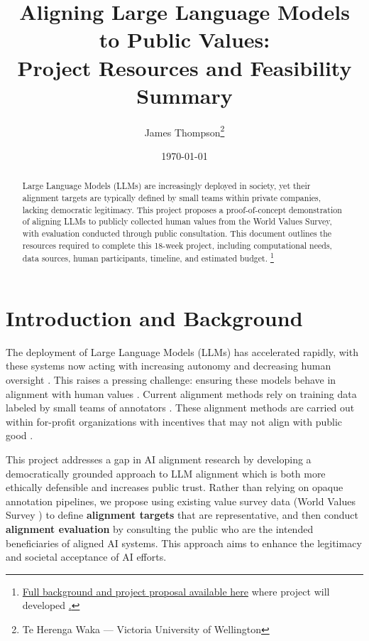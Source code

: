 \documentclass[11pt, a4paper]{article}
\title{Aligning Large Language Models to Public Values:\\Project Resources and Feasibility Summary}
\author{James Thompson\thanks{Te Herenga Waka — Victoria University of Wellington}}
\date{\today}
\newcommand{\term}[1]{\textbf{#1}}
\begin{document}
\maketitle

\begin{abstract}
	Large Language Models (LLMs) are increasingly deployed in society, yet their alignment targets are typically defined by small teams within private companies, lacking democratic legitimacy. This project proposes a proof-of-concept demonstration of aligning LLMs to publicly collected human values from the World Values Survey, with evaluation conducted through public consultation. This document outlines the resources required to complete this 18-week project, including computational needs, data sources, human participants, timeline, and estimated budget. \footnote{\href{https://raw.githubusercontent.com/1jamesthompson1/AIML501/main/output/AIML501_James_Thompson.pdf}{Full background and project proposal available here} where project will developed \href{https://github.com/1jamesthompson1/AIML589}.}


\end{abstract}

\section{Introduction and Background}

The deployment of Large Language Models (LLMs) has accelerated rapidly, with these systems now acting with increasing autonomy and decreasing human oversight \cite{bommasaniOpportunitiesRisksFoundation2022}. This raises a pressing challenge: ensuring these models behave in alignment with human values \cite{amodeiConcreteProblemsAI2016a,hendrycksUnsolvedProblemsML2022,bostromEthicsArtificialIntelligence2014}. Current alignment methods rely on training data labeled by small teams of annotators \cite{baiTrainingHelpfulHarmless2022,ouyangTrainingLanguageModels2022}. These alignment methods are carried out within for-profit organizations with incentives that may not align with public good \cite{r.h.coarseProblemSocialCost,hendrycksAligningAIShared2023}.

This project addresses a gap in AI alignment research by developing a democratically grounded approach to LLM alignment which is both more ethically defensible and increases public trust. Rather than relying on opaque annotation pipelines, we propose using existing value survey data (World Values Survey \cite{WVS2020}) to define \term{alignment targets} that are representative, and then conduct \term{alignment evaluation} by consulting the public who are the intended beneficiaries of aligned AI systems. This approach aims to enhance the legitimacy and societal acceptance of AI efforts.
\end{document}
